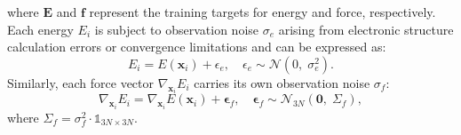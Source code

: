 where $\mathbf{E}$ and $\mathbf{f}$ represent the training targets for energy and force, respectively.
Each energy $E_i$ is subject to observation noise $\sigma_{e}$ arising from electronic structure calculation errors or convergence limitations and can be expressed as:
\begin{equation}
    \label{equ:3.11}
E_{i} = E(\mathbf{x}_{i}) + \epsilon_{e}, \quad \epsilon_{e} \sim \mathcal{N}(0,\;\sigma_{e}^{2}).
\end{equation}
Similarly, each force vector $\nabla_{\mathbf{x}_{i}} E_i$ carries its own observation noise $\sigma_{f}$:
\begin{equation}
    \label{equ:3.12}
\nabla_{\mathbf{x}_{i}} E_{i} = \nabla_{\mathbf{x}_{i}} E(\mathbf{x}_{i}) + \boldsymbol\epsilon_{f}, \quad \boldsymbol\epsilon_{f} \sim \mathcal{N}_{3N}(\mathbf{0},\;\Sigma_{f} ),
\end{equation}
where $\Sigma_{f} = \sigma^{2}_{f}\cdot\mathbb{1}_{3N\times 3N}$.

